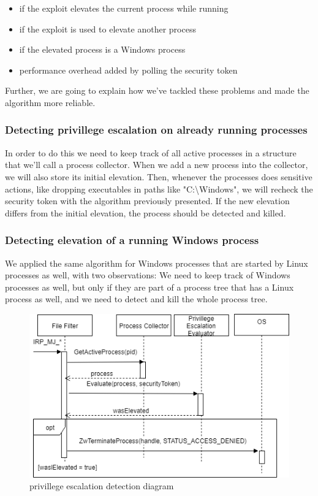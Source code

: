 \documentclass[conference]{IEEEtran}
\begin{document}
    \begin{itemize}
        \item if the exploit elevates the current process while running
        \item if the exploit is used to elevate another process
        \item if the elevated process is a Windows process
        \item performance overhead added by polling the security token
    \end{itemize}

    Further, we are going to explain how we've tackled these problems and made the algorithm more reliable.\\

    \subsubsection{Detecting privillege escalation on already running processes}
    In order to do this we need to keep track of all active processes in a structure that we'll call a process collector. When we add a new process
    into the collector, we will also store its initial elevation. Then, whenever the processes does sensitive actions, like dropping executables
    in paths like "C:\textbackslash Windows", we will recheck the security token with the algorithm previously presented. If the new elevation differs from the
    initial elevation, the process should be detected and killed.\\

    \subsubsection{Detecting elevation of a running Windows process}
    We applied the same algorithm for Windows processes that are started by Linux processes as well, with two observations:
    We need to keep track of Windows processes as well, but only if they are part of a process tree that has a Linux process as well, and we
    need to detect and kill the whole process tree.\\

    \begin{figure}[tb]
        \centering
        \includegraphics[width=\columnwidth]{DetectionDiagram.png}
        \caption{privillege escalation detection diagram}
        \label{fig2}
    \end{figure}
\end{document}
